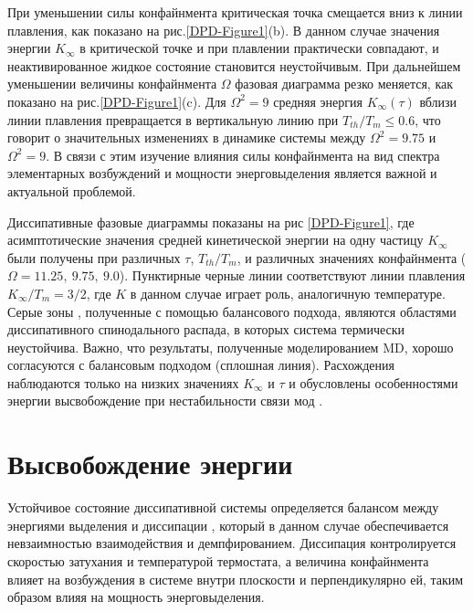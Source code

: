 При уменьшении силы конфайнмента критическая точка смещается вниз к линии плавления, как показано на рис.\ref{DPD-Figure1}(b). 
В данном случае значения энергии $K_{\infty}$ в критической точке и при плавлении практически совпадают, и неактивированное жидкое состояние становится неустойчивым. 
При дальнейшем уменьшении величины конфайнмента $\Omega$ фазовая диаграмма резко меняется, как показано на рис.\ref{DPD-Figure1}(c). Для $\Omega^2 = 9$ средняя энергия $K_{\infty}(\tau)$ вблизи линии плавления превращается 
в вертикальную линию при $ T_{th}/T_m \leq 0.6$, что говорит о значительных изменениях в динамике системы между $\Omega^2 = 9.75$ и $\Omega^2 = 9$. В связи с этим изучение влияния силы конфайнмента 
на вид спектра элементарных возбуждений и мощности энерговыделения является важной и актуальной проблемой.

Диссипативные фазовые диаграммы показаны на рис \ref{DPD-Figure1},
где асимптотические значения средней кинетической энергии
на одну частицу $K_{\infty}$ были получены при различных $\tau$, $T_{th}/T_m$,
и различных значениях конфайнмента ($\Omega = 11.25, ~9.75,~ 9.0$).
Пунктирные черные линии соответствуют линии плавления $K_{\infty} / T_m = 3/2$, где $K$ в данном случае играет роль, аналогичную  температуре. 
Серые зоны , полученные с помощью балансового подхода, являются областями диссипативного спинодального распада, в которых система термически неустойчива. Важно, что результаты, полученные моделированием MD, хорошо согласуются с балансовым подходом (сплошная линия). Расхождения наблюдаются только на низких значениях $K_{\infty}$ и $\tau$ и обусловлены особенностями энергии
высвобождение при нестабильности связи мод \cite{10.1103/physreve.63.016409, 10.1103/physrevlett.104.195001}.

\section{Высвобождение энергии}

Устойчивое состояние диссипативной системы определяется балансом между энергиями выделения и диссипации \cite{10.1039/c8sm01836g}, который в данном случае обеспечивается невзаимностью взаимодействия и демпфированием.
Диссипация контролируется скоростью затухания и температурой термостата, а величина конфайнмента влияет на возбуждения в системе внутри плоскости и перпендикулярно ей, таким образом влияя на мощность энерговыделения. 

